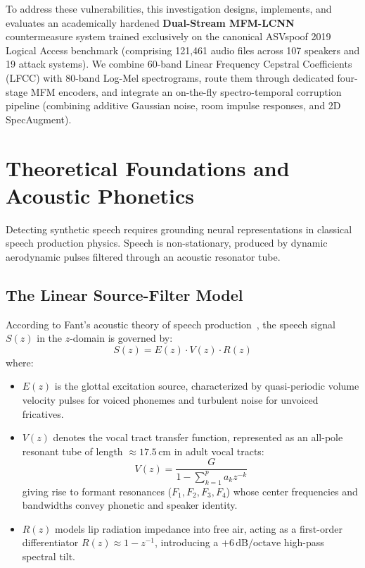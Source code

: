 \documentclass[runningheads]{llncs}
\begin{document}
To address these vulnerabilities, this investigation designs, implements, and evaluates an academically hardened \textbf{Dual-Stream MFM-LCNN} countermeasure system trained exclusively on the canonical ASVspoof 2019 Logical Access benchmark (comprising 121,461 audio files across 107 speakers and 19 attack systems). We combine 60-band Linear Frequency Cepstral Coefficients (LFCC) with 80-band Log-Mel spectrograms, route them through dedicated four-stage MFM encoders, and integrate an on-the-fly spectro-temporal corruption pipeline (combining additive Gaussian noise, room impulse responses, and 2D SpecAugment).

\section{Theoretical Foundations and Acoustic Phonetics}
\label{sec:foundations}
Detecting synthetic speech requires grounding neural representations in classical speech production physics. Speech is non-stationary, produced by dynamic aerodynamic pulses filtered through an acoustic resonator tube.

\subsection{The Linear Source-Filter Model}
According to Fant's acoustic theory of speech production~\cite{fant1960acoustic}, the speech signal $S(z)$ in the $z$-domain is governed by:
\begin{equation}
S(z) = E(z) \cdot V(z) \cdot R(z)
\label{eq:source_filter}
\end{equation}
where:
\begin{itemize}
    \item $E(z)$ is the glottal excitation source, characterized by quasi-periodic volume velocity pulses for voiced phonemes and turbulent noise for unvoiced fricatives.
    \item $V(z)$ denotes the vocal tract transfer function, represented as an all-pole resonant tube of length $\approx 17.5\,\text{cm}$ in adult vocal tracts:
    \begin{equation}
    V(z) = \frac{G}{1 - \sum_{k=1}^{p} a_k z^{-k}}
    \end{equation}
    giving rise to formant resonances ($F_1, F_2, F_3, F_4$) whose center frequencies and bandwidths convey phonetic and speaker identity.
    \item $R(z)$ models lip radiation impedance into free air, acting as a first-order differentiator $R(z) \approx 1 - z^{-1}$, introducing a $+6\,\text{dB/octave}$ high-pass spectral tilt.
\end{itemize}
\end{document}
